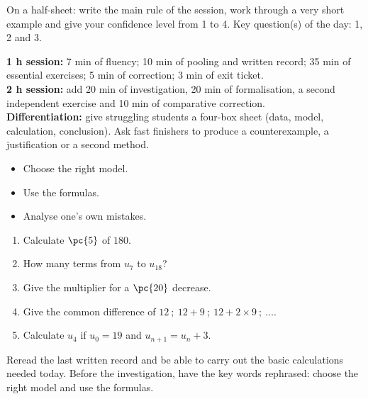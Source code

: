 \begin{exitticket}[3 minutes]On a half-sheet: write the main rule of the session, work through a very short example and give your confidence level from 1 to 4. Key question(s) of the day: 1, 2 and 3.\end{exitticket}

\ifmxteacher
\begin{method}
\textbf{1 h session:} 7 min of fluency; 10 min of pooling and written record; 35 min of essential exercises; 5 min of correction; 3 min of exit ticket.\\
    \textbf{2 h session:} add 20 min of investigation, 20 min of formalisation, a second independent exercise and 10 min of comparative correction.\\
    \textbf{Differentiation:} give struggling students a four-box sheet (data, model, calculation, conclusion). Ask fast finishers to produce a counterexample, a justification or a second method.
\end{method}
\fi
{}
\begin{objectives}\begin{itemize}\item Choose the right model.\item Use the formulas.\item Analyse one's own mistakes.\end{itemize}\end{objectives}
\begin{fluency}\begin{enumerate}\item Calculate $\pc{5}$ of $180$. \item How many terms from $u_{7}$ to $u_{18}$? \item Give the multiplier for a $\pc{20}$ decrease. \item Give the common difference of $12\ ;\ 12+9\ ;\ 12+2\times9\ ;\ \ldots$. \item Calculate $u_4$ if $u_0=19$ and $u_{n+1}=u_n+3$. \end{enumerate}\end{fluency}
\begin{prerequisites}Reread the last written record and be able to carry out the basic calculations needed today. Before the investigation, have the key words rephrased: choose the right model and use the formulas.\end{prerequisites}

